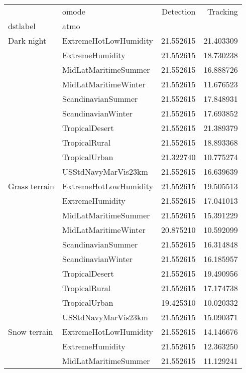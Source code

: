 \begin{tabular}{llrr}
\toprule
             & omode &  Detection &   Tracking \\
dstlabel & atmo &            &            \\
\midrule
Dark night & ExtremeHotLowHumidity &  21.552615 &  21.403309 \\
             & ExtremeHumidity &  21.552615 &  18.730238 \\
             & MidLatMaritimeSummer &  21.552615 &  16.888726 \\
             & MidLatMaritimeWinter &  21.552615 &  11.676523 \\
             & ScandinavianSummer &  21.552615 &  17.848931 \\
             & ScandinavianWinter &  21.552615 &  17.693852 \\
             & TropicalDesert &  21.552615 &  21.389379 \\
             & TropicalRural &  21.552615 &  18.893368 \\
             & TropicalUrban &  21.322740 &  10.775274 \\
             & USStdNavyMarVis23km &  21.552615 &  16.639639 \\
Grass terrain & ExtremeHotLowHumidity &  21.552615 &  19.505513 \\
             & ExtremeHumidity &  21.552615 &  17.041013 \\
             & MidLatMaritimeSummer &  21.552615 &  15.391229 \\
             & MidLatMaritimeWinter &  20.875210 &  10.592099 \\
             & ScandinavianSummer &  21.552615 &  16.314848 \\
             & ScandinavianWinter &  21.552615 &  16.185957 \\
             & TropicalDesert &  21.552615 &  19.490956 \\
             & TropicalRural &  21.552615 &  17.174738 \\
             & TropicalUrban &  19.425310 &  10.020332 \\
             & USStdNavyMarVis23km &  21.552615 &  15.090371 \\
Snow terrain & ExtremeHotLowHumidity &  21.552615 &  14.146676 \\
             & ExtremeHumidity &  21.552615 &  12.363250 \\
             & MidLatMaritimeSummer &  21.552615 &  11.129241 \\

\end{tabular}
